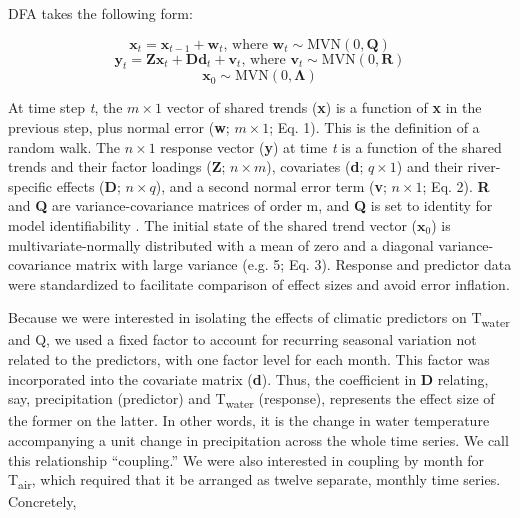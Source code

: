 \documentclass[notitlepage]{article}
\begin{document}
DFA takes the following form:

\begin{equation}
    \textbf{x}_t = \textbf{x}_{t-1} + \textbf{w}_t\textrm{, where } \textbf{w}_t \sim \textrm{MVN}(0,\textbf{Q})
\end{equation}
\begin{equation}
    \textbf{y}_t = \textbf{Zx}_t + \textbf{Dd}_t + \textbf{v}_t\textrm{, where } \textbf{v}_t \sim \textrm{MVN}(0,\textbf{R})
\end{equation}
\begin{equation}
    \textbf{x}_0 \sim \textrm{MVN}(0,\bm{\Lambda})
\end{equation}

At time step {\it t}, the $m \times 1$ vector of shared trends (\textbf{x}) is a function of \textbf{x} in the previous step, plus normal error (\textbf{w}; $m\times 1$; Eq. 1). This is the definition of a random walk. The $n\times 1$ response vector (\textbf{y}) at time {\it t} is a function of the shared trends and their factor loadings (\textbf{Z}; $n\times m$), covariates (\textbf{d}; $q\times 1$) and their river-specific effects (\textbf{D}; $n\times q$), and a second normal error term (\textbf{v}; $n\times 1$; Eq. 2). \textbf{R} and \textbf{Q} are variance-covariance matrices of order m, and \textbf{Q} is set to identity for model identifiability \citep{harvey1990forecasting}. The initial state of the shared trend vector ($\bm{x}_0$) is multivariate-normally distributed with a mean of zero and a diagonal variance-covariance matrix with large variance (e.g. 5; Eq. 3). Response and predictor data were standardized to facilitate comparison of effect sizes and avoid error inflation.

Because we were interested in isolating the effects of climatic predictors on T\textsubscript{water} and Q, we used a fixed factor to account for recurring seasonal variation not related to the predictors, with one factor level for each month. This factor was incorporated into the covariate matrix (\textbf{d}). Thus, the coefficient in \textbf{D} relating, say, precipitation (predictor) and T\textsubscript{water} (response), represents the effect size of the former on the latter. In other words, it is the change in water temperature accompanying a unit change in precipitation across the whole time series. We call this relationship ``coupling.'' We were also interested in coupling by month for T\textsubscript{air}, which required that it be arranged as twelve separate, monthly time series. Concretely,
\end{document}
